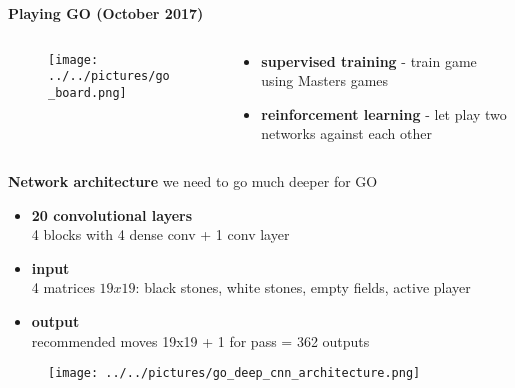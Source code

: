 \documentclass[xcolor=dvipsnames]{beamer}
\begin{document}
\begin{frame}{\bf Playing GO (October 2017)}


  \begin{columns}
  \begin{column}{0.5\textwidth}

    \begin{figure}[!htb]
      \centering
      \texttt{[image: ../../pictures/go\_board.png]}
    \end{figure}


  \end{column}
  \begin{column}{0.5\textwidth}  %

    \scriptsize
    {
      \begin{itemize}
        \item {\bf supervised training} - train game using Masters games
        \item {\bf reinforcement learning} - let play two networks against each other
      \end{itemize}
    }
  \end{column}
  \end{columns}

\end{frame}

\begin{frame}{\bf Network architecture}
we need to go much deeper for GO
\begin{itemize}
  \item {\bf 20 convolutional layers} \\ 4 blocks with 4 dense conv + 1 conv layer
  \item {\bf input} \\ 4 matrices $19x19$: black stones, white stones, empty fields, active player
  \item {\bf output} \\ recommended moves 19x19 + 1 for pass = 362 outputs

\end{itemize}

  \begin{figure}[!htb]
    \centering
    \texttt{[image: ../../pictures/go\_deep\_cnn\_architecture.png]}
  \end{figure}

\end{frame}
\end{document}
